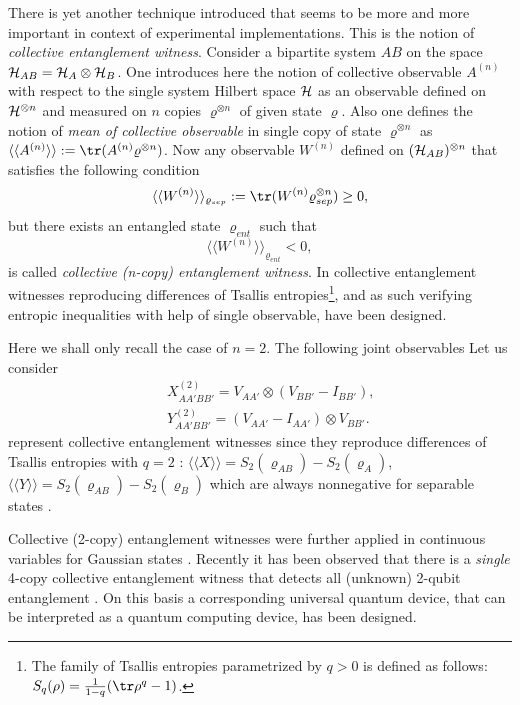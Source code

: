 \documentclass[rmp,12pt,preprint]{revtex4-2}
\begin{document}
There is yet another technique introduced \cite{Witnesses} that
seems to be more and more important in context of experimental
implementations. This is the notion of {\it collective entanglement
witness}. Consider a bipartite system $AB$ on the space ${\cal
H}_{AB}={\cal H}_{A} \otimes {\cal H}_{B}$. One  introduces  here
the notion of collective observable $A^{(n)}$ with respect to the
single system Hilbert space ${\cal H}$ as an observable defined on
${\cal H}^{\otimes n}$ and measured on $n$ copies $\varrho^{\otimes
n}$ of given state $\varrho$. Also one defines the notion of
{\it mean of collective observable} in single copy of state
$\varrho^{\otimes n}$ as $\langle\langle A^{(n)} \rangle
\rangle:={\tr}(A^{(n)} \varrho^{\otimes n})$. Now any observable
$W^{(n)}$ defined on $({\cal H}_{AB})^{\otimes n}$ that satisfies
the following condition
\begin{equation}
\langle \langle
W^{(n)}\rangle\rangle_{\varrho_{sep}}:={\tr}(W^{(n)}\varrho_{sep}^{\otimes
n}) \geq 0,
\end{equation}
but there exists an entangled state $\varrho_{ent}$ such that
\begin{equation}
\langle \langle W^{(n)} \rangle \rangle_{\varrho_{ent}} < 0,
\end{equation}
is called {\it collective (n-copy) entanglement witness}. In
\cite{Witnesses} collective entanglement witnesses reproducing
differences of Tsallis entropies\footnote{The family of Tsallis
  entropies parametrized by $q>0$ is defined as follows:
  $S_q(\rho)={1\over {1-q}}({\tr}\rho^{q} -1)$.}, and as such
verifying entropic inequalities with help of single observable, have
been designed.

Here we shall only recall the case of $n=2$.
The following joint observables
Let us consider
\begin{eqnarray}
&&X_{AA'BB'}^{(2)}=V_{AA'} \otimes ( V_{BB'} - I_{BB'} ), \nonumber \\
&&Y_{AA'BB'}^{(2)}=(V_{AA'} - I_{AA'}) \otimes V_{BB'}.
\label{XY}
\end{eqnarray}
represent collective entanglement witnesses since they reproduce
differences of Tsallis entropies with $q=2$ : $\langle \langle X \rangle \rangle
= S_{2}(\varrho_{AB})-S_{2}(\varrho_{A})$, $\langle\langle Y \rangle
\rangle = S_{2}(\varrho_{AB})-S_{2}(\varrho_{B})$ which are always
nonnegative for separable states \cite{alpha}.

Collective (2-copy) entanglement witnesses were further applied in
continuous variables for Gaussian states
\cite{StobinskaW-teor-s}. Recently it has been observed that there is
a {\it single} 4-copy collective entanglement witness that detects all
(unknown) 2-qubit entanglement \cite{Augusiak}. On this basis a
corresponding universal quantum device, that can be interpreted as a
quantum computing device, has been designed.
\end{document}
